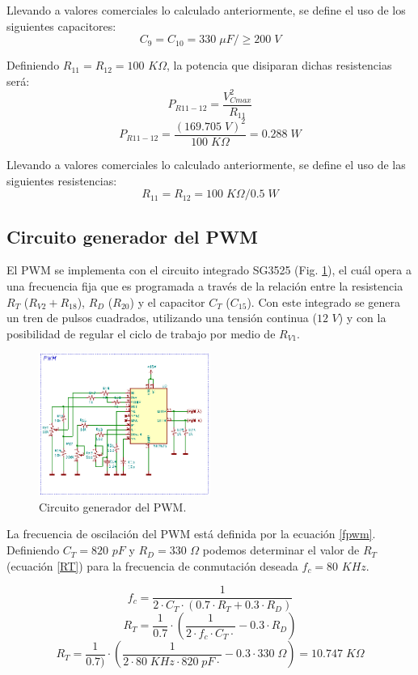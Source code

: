 \documentclass[11pt, a4paper]{article}
\begin{document}
Llevando a valores comerciales lo calculado anteriormente, se define el uso de los siguientes capacitores:
\[ C_9 = C_{10} = 330 \; \mu F / \geq 200 \;V \]

Definiendo $R_{11} = R_{12} = 100$ $K\Omega$, la potencia que disiparan dichas resistencias será:
\begin{equation}
P_{R11-12} = \frac{V_{Cmax}^2}{R_{11}}
\label{PR1112}
\end{equation}
\[ P_{R11-12} = \frac{(169.705 \; V)^2}{100 \; K\Omega } = 0.288 \; W \]

Llevando a valores comerciales lo calculado anteriormente, se define el uso de las siguientes resistencias:
\[ R_{11} = R_{12} = 100 \; K\Omega / 0.5 \;W \]

\subsection{Circuito generador del PWM}
El PWM se implementa con el circuito integrado SG3525 (Fig. \ref{pwm}), el cuál opera a una frecuencia fija que es programada a través de la relación entre la resistencia $R_T$ ($R_{V2} + R_{18}$), $R_D$ ($R_{20}$) y el capacitor $C_T$ ($C_{15}$). Con este integrado se genera un tren de pulsos cuadrados, utilizando una tensión continua ($12$ $V$) y con la posibilidad de regular el ciclo de trabajo por medio de $R_{V1}$.

\begin{figure}[h]
	\centering
		\includegraphics[width = 0.5\textwidth]{Imagenes/PWM}
	\caption{Circuito generador del PWM.}
	\label{pwm}
\end{figure}

La frecuencia de oscilación del PWM está definida por la ecuación \ref{fpwm}. Definiendo $C_T = 820$ $pF$ y $R_D = 330$ $\Omega$ podemos determinar el valor de $R_T$ (ecuación \ref{RT}) para la frecuencia de conmutación deseada $f_c = 80$ $KHz$.

\begin{equation}
f_c = \frac{1}{2 \cdot C_T \cdot (0.7 \cdot R_T + 0.3 \cdot R_D)}
\label{fpwm}
\end{equation}
\begin{equation}
R_T = \frac{1}{0.7} \cdot (\frac{1}{2 \cdot f_c \cdot C_T \cdot} - 0.3 \cdot R_D)
\label{RT}
\end{equation}
\[ R_T = \frac{1}{0.7)} \cdot (\frac{1}{2 \cdot 80 \; KHz \cdot 820 \; pF \cdot} - 0.3 \cdot 330 \; \Omega) = 10.747 \; K\Omega \]
\end{document}
